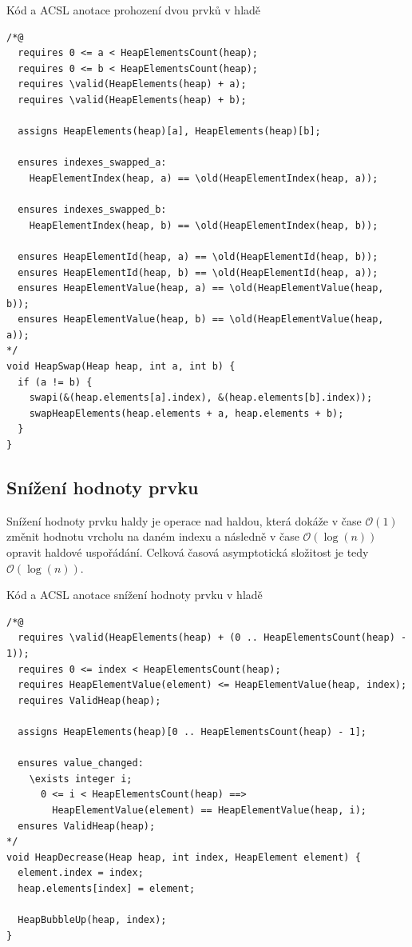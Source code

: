 \begin{listing}[H]
	\caption{Kód a ACSL anotace prohození dvou prvků v hladě}
	\label{code:HeapSwap}
	\begin{verbatim}
/*@
  requires 0 <= a < HeapElementsCount(heap);
  requires 0 <= b < HeapElementsCount(heap);
  requires \valid(HeapElements(heap) + a);
  requires \valid(HeapElements(heap) + b);

  assigns HeapElements(heap)[a], HeapElements(heap)[b];

  ensures indexes_swapped_a:
    HeapElementIndex(heap, a) == \old(HeapElementIndex(heap, a));

  ensures indexes_swapped_b:
    HeapElementIndex(heap, b) == \old(HeapElementIndex(heap, b));

  ensures HeapElementId(heap, a) == \old(HeapElementId(heap, b));
  ensures HeapElementId(heap, b) == \old(HeapElementId(heap, a));
  ensures HeapElementValue(heap, a) == \old(HeapElementValue(heap, b));
  ensures HeapElementValue(heap, b) == \old(HeapElementValue(heap, a));
*/
void HeapSwap(Heap heap, int a, int b) {
  if (a != b) {
    swapi(&(heap.elements[a].index), &(heap.elements[b].index));
    swapHeapElements(heap.elements + a, heap.elements + b);
  }
}
	\end{verbatim}
\end{listing}

\subsection{Snížení hodnoty prvku}
\label{subsec:HeapDecrease}

Snížení hodnoty prvku haldy je operace nad haldou, která dokáže v čase $\mathcal{O}(1)$ změnit hodnotu vrcholu na daném indexu a následně v čase $\mathcal{O}(\log(n))$ opravit haldové uspořádání. Celková časová asymptotická složitost je tedy $\mathcal{O}(\log(n))$.

\begin{listing}[H]
	\caption{Kód a ACSL anotace snížení hodnoty prvku v hladě}
	\label{code:HeapDecrease}
	\begin{verbatim}
/*@
  requires \valid(HeapElements(heap) + (0 .. HeapElementsCount(heap) - 1));
  requires 0 <= index < HeapElementsCount(heap);
  requires HeapElementValue(element) <= HeapElementValue(heap, index);
  requires ValidHeap(heap);

  assigns HeapElements(heap)[0 .. HeapElementsCount(heap) - 1];

  ensures value_changed:
    \exists integer i;
      0 <= i < HeapElementsCount(heap) ==>
        HeapElementValue(element) == HeapElementValue(heap, i);
  ensures ValidHeap(heap);
*/
void HeapDecrease(Heap heap, int index, HeapElement element) {
  element.index = index;
  heap.elements[index] = element;

  HeapBubbleUp(heap, index);
}
	\end{verbatim}
\end{listing}

